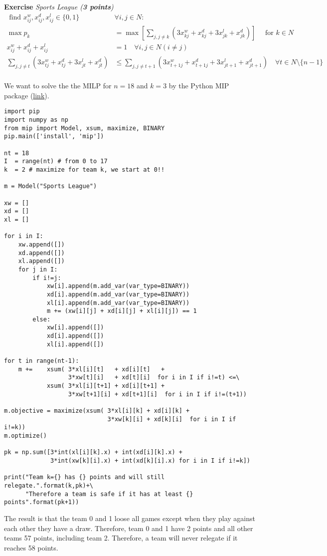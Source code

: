 \documentclass[a4paper,10pt]{article}
\newcounter{exc}
\newenvironment{exercise}[1]%
{\refstepcounter{exc}\textbf{Exercise \arabic{exc}} \emph{#1}\\}
{

\hrulefill\medskip}%
\begin{document}
\begin{exercise}{Sports League (\textbf{3 points})}
\begin{align}
  \text{ find } x_{ij}^w, x_{ij}^d, x_{ij}^l \in \{0,1\} \quad & \forall i,j\in N:\\
  \max p_k &= \max \left[ \sum_{j,j\neq k} (3x^w_{kj}+ x^d_{kj} + 3x^l_{jk}+ x^d_{jk}) \right]\quad \text{ for } k\in N\\
  x^w_{ij}+ x^d_{ij}+ x^l_{ij}& = 1 \quad \forall i,j\in N( i \neq j) \\
  \sum_{j,j\neq t} (3x^w_{tj}+ x^d_{tj} + 3x^l_{jt}+ x^d_{jt})& \leq 
  \sum_{j,j\neq t+1} (3x^w_{t+1j}+ x^d_{t+1j} + 3x^l_{jt+1}+ x^d_{jt+1}) \quad \forall t\in N\setminus \{n-1\}\\
\end{align}

We want to solve the the MILP for $n=18$ and $k=3$ by the Python MIP package (\href{https://pypi.org/project/mip/}{link}).


\begin{lstlisting}[style = Python]
import pip
import numpy as np
from mip import Model, xsum, maximize, BINARY
pip.main(['install', 'mip'])

nt = 18
I  = range(nt) # from 0 to 17
k  = 2 # maximize for team k, we start at 0!!

m = Model("Sports League")

xw = []
xd = []
xl = []

for i in I:
    xw.append([])
    xd.append([])
    xl.append([])
    for j in I:
        if i!=j:
            xw[i].append(m.add_var(var_type=BINARY))
            xd[i].append(m.add_var(var_type=BINARY))
            xl[i].append(m.add_var(var_type=BINARY))
            m += (xw[i][j] + xd[i][j] + xl[i][j]) == 1
        else:
            xw[i].append([])
            xd[i].append([])
            xl[i].append([])

for t in range(nt-1):
    m +=    xsum( 3*xl[i][t]   + xd[i][t]   +
                  3*xw[t][i]   + xd[t][i]  for i in I if i!=t) <=\
            xsum( 3*xl[i][t+1] + xd[i][t+1] +
                  3*xw[t+1][i] + xd[t+1][i]  for i in I if i!=(t+1))

m.objective = maximize(xsum( 3*xl[i][k] + xd[i][k] +
                             3*xw[k][i] + xd[k][i]  for i in I if i!=k))
m.optimize()

pk = np.sum([3*int(xl[i][k].x) + int(xd[i][k].x) +
             3*int(xw[k][i].x) + int(xd[k][i].x) for i in I if i!=k])

print("Team k={} has {} points and will still relegate.".format(k,pk)+\
      "Therefore a team is safe if it has at least {} points".format(pk+1))
\end{lstlisting}
The result is that the team 0 and 1 loose all games except when they play against each other they have a draw.
Therefore, team 0 and 1 have 2 points and all other teams 57 points, including team 2. Therefore, a team will never
relegate if it reaches 58 points.


\end{exercise}
\end{document}
